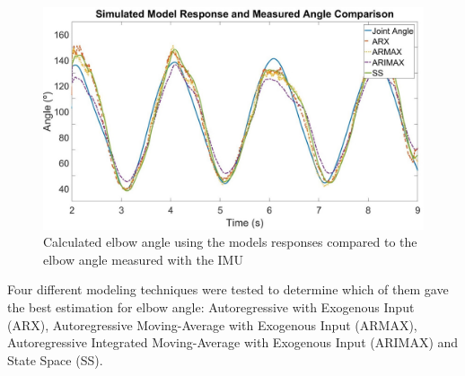\documentclass[letterpaper, 10 pt, conference]{ieeeconf}  %
\begin{document}
\begin{figure}[thpb]
      \centering
      \includegraphics[width=0.95\columnwidth]{Images/simulated_response.jpg}
      \caption{Calculated elbow angle using the models responses compared to the elbow angle measured with the IMU}
      \label{Models Comparison}
   \end{figure}


% 
% 
% 





Four different modeling techniques were tested to determine which of them gave the best estimation for elbow angle: Autoregressive with Exogenous Input (ARX), Autoregressive Moving-Average with Exogenous Input (ARMAX), Autoregressive Integrated Moving-Average with Exogenous Input (ARIMAX) and State Space (SS).
\end{document}
